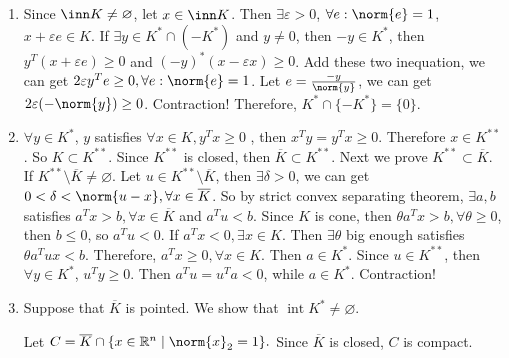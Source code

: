 \documentclass{ctexart}
\begin{document}
\begin{solution}
\begin{enumerate}
      \(\inn K^* \subset \{y \mid y^T x >0, \forall x \in K\} \):
      \(\forall y \in \inn K^* \), \(\exists \varepsilon >0 \), \(\forall e: \norm{e}=1 \), we can get \(y + \varepsilon e \in K^* \).
      \(\forall x \in K, x \neq 0 \), \(\frac{x}{\norm{x}} \in K \), then \(  y-\varepsilon x \in K^*\).
      So \((y-\varepsilon \frac{x}{\norm{x}})^T \frac{x}{\norm{x}}=y^T \frac{x}{\norm{x}}-\varepsilon \geq 0 \), so \(y^T \frac{x}{\norm{x}} \geq \varepsilon >0 \).
      Therefore \(y \in \{y \mid y^T x >0, \forall x \in K \} \).

    \item Since \(\inn K \neq \varnothing \), let \(x \in \inn K \). Then \(\exists \varepsilon >0 \), \(\forall e:\norm{e}=1 \), \(x + \varepsilon e \in K \).
      If \(\exists y \in K^* \cap (-K^*) \) and \(y \neq 0 \), then \(-y \in K^* \),
      then \(y^T(x + \varepsilon e) \geq 0 \) and \((-y)^*(x -\varepsilon x) \geq 0 \). Add these two inequation,
      we can get \(2\varepsilon y^Te \geq 0, \forall e:\norm{e}=1 \). Let \(e=\frac{-y}{\norm{y}} \), we can get \(2\varepsilon (-\norm{y}) \geq 0 \). Contraction!
      Therefore, \(K^* \cap \{-K^*\} = \{0\} \).

    \item \(\forall y \in K^* \), \(y \) satisfies \( \forall x \in K, y^Tx \geq 0\) , then \(x^Ty=y^Tx \geq 0 \).
      Therefore \(x \in K^{**} \). So \(K \subset K^{**} \). Since \(K^{**} \) is closed, then \(\overline{K} \subset K^{**} \).
      Next we prove \( K^{**} \subset \overline{K} \). If \(K^{**} \setminus \overline{K} \neq \varnothing \). Let \(u \in  K^{**} \setminus \overline{K} \), then \(\exists  \delta >0 \), we can get \(0 < \delta < \norm{u-x}, \forall x \in \overline{K} \).
      So by strict convex separating theorem, \(\exists a, b \) satisfies \(a^Tx >b, \forall x \in \overline{K} \) and
      \(a^Tu < b \).
      Since \(K \) is cone, then \(\theta a^Tx >b, \forall \theta \geq 0 \), then \(b \leq 0 \), so \(a^Tu <0 \). If \(a^Tx <0, \exists x \in K \). Then \(\exists \theta \)  big enough satisfies \(\theta a^Tu x < b \). Therefore, \(a^Tx \geq 0, \forall x \in K \). Then \(a \in K^* \).
      Since \(u \in K^{**} \), then \(\forall y \in K^* \), \(u^Ty \geq 0 \).
      Then \(a^Tu=u^Ta<0 \), while \(a \in K^* \). Contraction!

    \item Suppose that \(\overline{K}\) is pointed. We show that
      \(
        \operatorname{int} K^* \neq \varnothing.
      \)

      Let
      \(
        C=\overline{K}\cap \{x\in\mathbb{R}^n\mid \norm{x}_2=1\}.
      \)
      Since \(\overline{K}\) is closed, \(C\) is compact.


\end{enumerate}
\end{solution}
\end{document}
